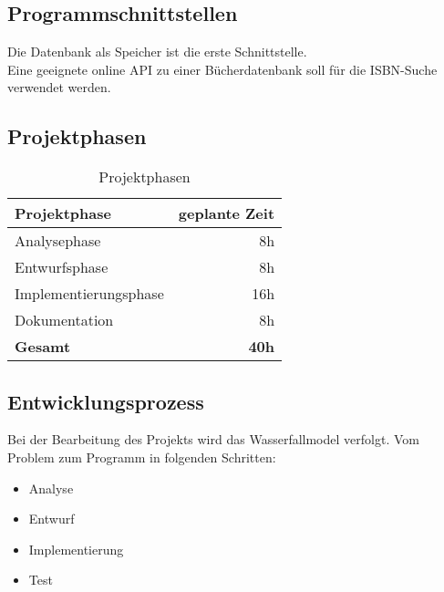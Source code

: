 \subsection{Programmschnittstellen}
Die Datenbank als Speicher ist die erste Schnittstelle.\\
Eine geeignete online API zu einer Bücherdatenbank soll für die ISBN-Suche verwendet werden.

\subsection{Projektphasen}
\begin{center}
\begin{table} [htb] %
\centering
\begin{tabular}{  l  r  }
\hline
\rowcolor{cyan}\textbf{Projektphase}&\textbf{geplante Zeit}\\
\hline
Analysephase&8h\\
\rowcolor{lightgray}Entwurfsphase&8h\\
Implementierungsphase&16h\\
\rowcolor{lightgray}Dokumentation&8h\\
\hline
\textbf{Gesamt}&\textbf{40h}\\
\hline
\end{tabular}
\caption{Projektphasen}
\label{tab:Projektphasen}
\end{table}
\end{center}

\subsection{Entwicklungsprozess}
Bei der Bearbeitung des Projekts wird das Wasserfallmodel verfolgt.
Vom Problem zum Programm in folgenden Schritten:
\begin{itemize}
\item{Analyse}
\item{Entwurf}
\item{Implementierung}
\item{Test}
\end{itemize}